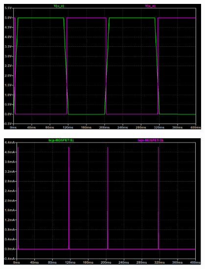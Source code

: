 \documentclass[12pt,english,ngerman]{scrartcl}
\begin{document}
\begin{figure}[H]
  \centering
    \includegraphics[width=0.95\textwidth]{./simdaten_lab/cmos/inverter/kennlinie_einaus.png}
    \caption{}
  \label{fig:sim_inv_wahrheit}
\end{figure}

\begin{figure}[H]
  \centering
    \includegraphics[width=0.95\textwidth]{./simdaten_lab/cmos/inverter/strom_correct_beide.png}
    \caption{}
  \label{fig:sim_inv_eingangsstrom}
\end{figure}
\end{document}
